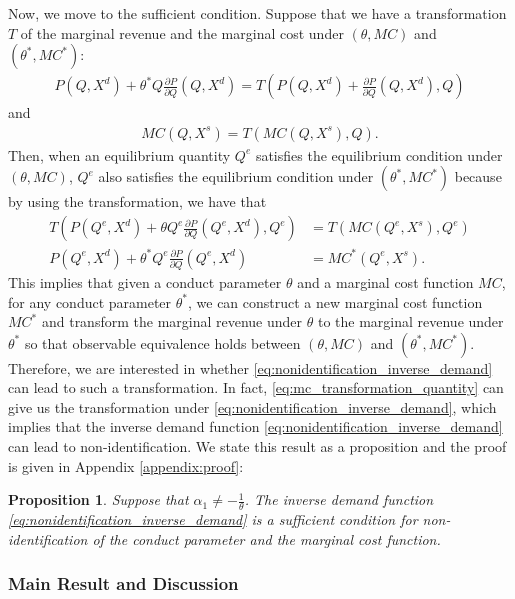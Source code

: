 \documentclass[11pt, a4paper]{article}
\newtheorem{proposition}{Proposition}
\theoremstyle{remark}
\begin{document}
Now, we move to the sufficient condition.
Suppose that we have a transformation $T$ of the marginal revenue and the marginal cost under $(\theta, MC)$ and $(\theta^{*}, MC^{*})$:
\begin{align}
    P(Q, X^{d}) + \theta^{*} Q \frac{\partial P}{\partial Q}(Q, X^{d}) = T\left(P(Q, X^{d}) + \frac{\partial P}{\partial Q}(Q, X^{d}), Q\right)
\end{align}
and
\begin{align}
    MC(Q, X^{s}) = T\left(MC(Q, X^{s}), Q\right).
\end{align}
Then, when an equilibrium quantity $Q^e$ satisfies the equilibrium condition under $(\theta, MC)$, $Q^e$ also satisfies the equilibrium condition under $(\theta^{*}, MC^{*})$ because by using the transformation, we have that
\begin{align}
    T\left(P(Q^e, X^{d}) + \theta Q^e \frac{\partial P}{\partial Q}(Q^e, X^{d}), Q^e\right)&= T\left(MC(Q^e, X^{s}), Q^e\right)\\
    P(Q^e, X^{d}) + \theta^{*} Q^e \frac{\partial P}{\partial Q}(Q^e, X^{d})&= MC^{*}(Q^e, X^{s}).
\end{align}
This implies that given a conduct parameter $\theta$ and a marginal cost function $MC$, for any conduct parameter $\theta^{*}$, we can construct a new marginal cost function $MC^{*}$ and transform the marginal revenue under $\theta$ to the marginal revenue under $\theta^{*}$ so that observable equivalence holds between $(\theta, MC)$ and $(\theta^{*}, MC^{*})$.
Therefore, we are interested in whether \eqref{eq:nonidentification_inverse_demand} can lead to such a transformation.
In fact, \eqref{eq:mc_transformation_quantity} can give us the transformation under \eqref{eq:nonidentification_inverse_demand}, which implies that the inverse demand function \eqref{eq:nonidentification_inverse_demand} can lead to non-identification.
We state this result as a proposition and the proof is given in Appendix \ref{appendix:proof}:
\begin{proposition}\label{proposition:sufficient_nonidentification}
    Suppose that $\alpha_1 \ne -\frac{1}{\theta}$. The inverse demand function \eqref{eq:nonidentification_inverse_demand} is a sufficient condition for non-identification of the conduct parameter and the marginal cost function.
\end{proposition}



\subsubsection{Main Result and Discussion}
\end{document}
